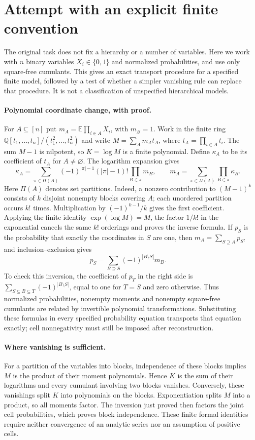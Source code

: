 \documentclass[11pt]{article}
\begin{document}
\section{Attempt with an explicit finite convention}
The original task does not fix a hierarchy or a number of variables.
Here we work with $n$ binary variables $X_i\in\{0,1\}$ and normalized
probabilities, and use only square-free cumulants. This gives an exact
transport procedure for a specified finite model, followed by a test of
whether a simpler vanishing rule can replace that procedure. It is not a
classification of unspecified hierarchical models.

\paragraph{Polynomial coordinate change, with proof.}
For $A\subseteq[n]$ put $m_A=\mathbb E\prod_{i\in A}X_i$, with
$m_\varnothing=1$. Work in the finite ring
$\mathbb Q[t_1,\ldots,t_n]/(t_1^2,\ldots,t_n^2)$ and write
$M=\sum_A m_A t_A$, where $t_A=\prod_{i\in A}t_i$.
The sum $M-1$ is nilpotent, so $K=\log M$ is a finite polynomial.
Define $\kappa_A$ to be its coefficient of $t_A$ for $A\ne\varnothing$.
The logarithm expansion gives
\[
\kappa_A=\sum_{\pi\in\Pi(A)}(-1)^{|\pi|-1}(|\pi|-1)!
                  \prod_{B\in\pi}m_B,
\qquad
m_A=\sum_{\pi\in\Pi(A)}\prod_{B\in\pi}\kappa_B.
\]
Here $\Pi(A)$ denotes set partitions. Indeed, a nonzero contribution to
$(M-1)^k$ consists of $k$ disjoint nonempty blocks covering $A$;
each unordered partition occurs $k!$ times. Multiplication by
$(-1)^{k-1}/k$ gives the first coefficient. Applying the finite identity
$\exp(\log M)=M$, the factor $1/k!$ in the exponential cancels the
same $k!$ orderings and proves the inverse formula.
If $p_S$ is the probability that exactly the coordinates in $S$ are one,
then $m_A=\sum_{S\supseteq A}p_S$, and inclusion--exclusion gives
\[
p_S=\sum_{B\supseteq S}(-1)^{|B\setminus S|}m_B.
\]
To check this inversion, the coefficient of $p_T$ in the right side is
$\sum_{S\subseteq B\subseteq T}(-1)^{|B\setminus S|}$, equal to one
for $T=S$ and zero otherwise. Thus normalized probabilities, nonempty
moments and nonempty square-free cumulants are related by invertible
polynomial transformations. Substituting these formulas in every
specified probability equation transports that equation exactly; cell
nonnegativity must still be imposed after reconstruction.

\paragraph{Where vanishing is sufficient.}
For a partition of the variables into blocks, independence of these
blocks implies $M$ is the product of their moment polynomials. Hence
$K$ is the sum of their logarithms and every cumulant involving two
blocks vanishes. Conversely, these vanishings split $K$ into polynomials
on the blocks. Exponentiation splits $M$ into a product, so all moments
factor. The inversion just proved then factors the joint cell
probabilities, which proves block independence. These finite formal
identities require neither convergence of an analytic series nor an
assumption of positive cells.
\end{document}
